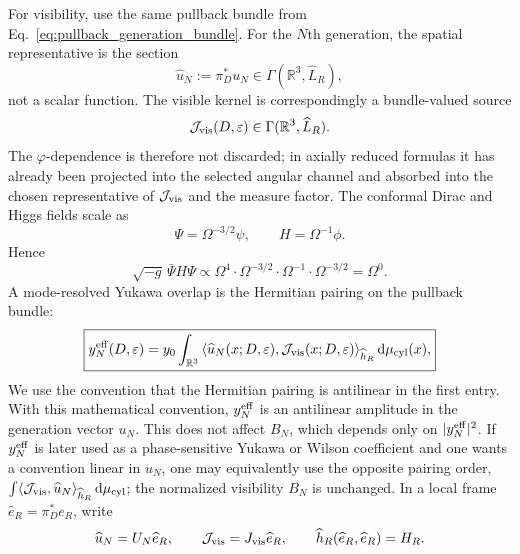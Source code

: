 \documentclass[aps,prd,preprint,notitlepage,nofootinbib,superscriptaddress,floatfix]{revtex4-2}
\newcommand{\dd}{\mathrm{d}}
\theoremstyle{remark}
\begin{document}
For visibility, use the same pullback bundle from Eq.~\eqref{eq:pullback_generation_bundle}.
For the \(N\)th generation, the spatial representative is the section
\begin{equation}
\widehat u_N:=\pi_D^*u_N
\in
\Gamma(\mathbb R^3,\widehat L_R),
\label{eq:uN_pullback}
\end{equation}
not a scalar function.
The visible kernel is correspondingly a bundle-valued source
\begin{equation}
\mathcal J_{\rm vis}(D,\varepsilon)
\in
\Gamma(\mathbb R^3,\widehat L_R).
\label{eq:Jvis_bundle}
\end{equation}
The \(\varphi\)-dependence is therefore not discarded; in axially reduced formulas it has already been projected into the selected angular channel and absorbed into the chosen representative of \(\mathcal J_{\rm vis}\) and the measure factor.
The conformal Dirac and Higgs fields scale as
\begin{equation}
\Psi=\Omega^{-3/2}\psi,
\qquad
H=\Omega^{-1}\phi.
\end{equation}
Hence
\begin{equation}
\sqrt{-g}\,\bar\Psi H\Psi
\propto
\Omega^4\cdot\Omega^{-3/2}\cdot\Omega^{-1}\cdot\Omega^{-3/2}
=
\Omega^0.
\label{eq:weyl_yukawa}
\end{equation}
A mode-resolved Yukawa overlap is the Hermitian pairing on the pullback bundle:
\begin{equation}
\boxed{
y_N^{\rm eff}(D,\varepsilon)
=
y_0
\int_{\mathbb R^3}
\left\langle
\widehat u_N(x;D,\varepsilon),
\mathcal J_{\rm vis}(x;D,\varepsilon)
\right\rangle_{\widehat h_R}
\dd\mu_{\rm cyl}(x),
}
\label{eq:y_eff}
\end{equation}
We use the convention that the Hermitian pairing is antilinear in the first entry.
With this mathematical convention, \(y_N^{\rm eff}\) is an antilinear amplitude in the generation vector \(u_N\).
This does not affect \(B_N\), which depends only on \(|y_N^{\rm eff}|^2\).
If \(y_N^{\rm eff}\) is later used as a phase-sensitive Yukawa or Wilson coefficient and one wants a convention linear in \(u_N\), one may equivalently use the opposite pairing order,
\(\int\langle\mathcal J_{\rm vis},\widehat u_N\rangle_{\widehat h_R}\,\dd\mu_{\rm cyl}\);
the normalized visibility \(B_N\) is unchanged.
In a local frame \(\widehat e_R=\pi_D^*e_R\), write
\begin{equation}
\widehat u_N=U_N\widehat e_R,
\qquad
\mathcal J_{\rm vis}=J_{\rm vis}\widehat e_R,
\qquad
\widehat h_R(\widehat e_R,\widehat e_R)=H_R.
\label{eq:local_visibility_frame}
\end{equation}
\end{document}
